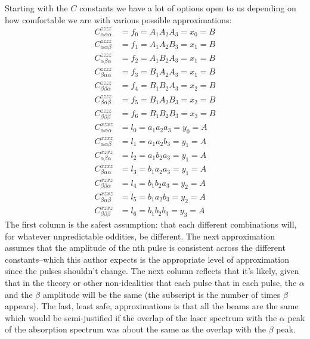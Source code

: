 Starting with the $C$ constants we have a lot of options open to us depending on how comfortable we are with various possible approximations:
\begin{align*}
	C_{\alpha \alpha \alpha}^{zzzz} &=f_0 = A_1 A_2 A_3 = x_0 = B \\
	C_{\alpha \alpha \beta}^{zzzz} &=f_1 = A_1 A_2 B_3 = x_1 = B\\
	C_{\alpha \beta \alpha}^{zzzz} &=f_2 = A_1 B_2 A_3 = x_1 = B \\
	C_{\beta \alpha \alpha}^{zzzz} &=f_3 = B_1 A_2 A_3 = x_1 = B \\
	C_{\beta \beta \alpha}^{zzzz} &=f_4 = B _1 B_2 A_3 = x_2 = B \\
	C_{\beta \alpha \beta}^{zzzz} &=f_5 = B_1 A_2 B_3 = x_2 = B \\
	C_{\beta \beta \beta}^{zzzz} &=f_6 = B_1 B_2 B_3 = x_3 = B  \\
	C_{\alpha \alpha \alpha}^{xzxz} &=l_0 = a_1 a_2 a_3 = y_0 = A \\
	C_{\alpha \alpha \beta}^{xzxz} &=l_1 = a_1 a_2 b_3 = y_1 = A \\
	C_{\alpha \beta \alpha}^{xzxz} &=l_2 = a_1 b_2 a_3 = y_1 = A \\
	C_{\beta \alpha \alpha}^{xzxz} &=l_3 = b_1 a_2 a_3 = y_1 = A \\
	C_{\beta \beta \alpha}^{xzxz} &=l_4 = b_1 b_2 a_3 = y_2 = A \\
	C_{\beta \alpha \beta}^{xzxz} &=l_5 = b_1 a_2 b_3 = y_2 = A \\
	C_{\beta \beta \beta}^{xzxz} &=l_6 = b_1 b_2 b_3 = y_3 = A
\end{align*}
The first column is the safest assumption: that each different combinations will, for whatever unpredictable oddities, be different.  The next approximation assumes that the amplitude of the nth pulse is consistent across the different constants--which this author expects is the appropriate level of approximation since the pulses shouldn't change.   The next column reflects that it's likely, given that in the theory or other non-idealities that each pulse that in each pulse, the $\alpha$ and the $\beta$ amplitude will be the same (the subscript is the number of times $\beta$ appears).  The last, least safe, approximations is that all the beams are the same which would be semi-justified if the overlap of the laser spectrum with the $\alpha$ peak of the absorption spectrum was about the same as the overlap with the $\beta$ peak.

